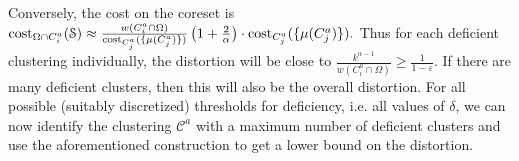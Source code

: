 Conversely, the cost on the coreset is $\text{cost}_{\Omega\cap C_i^a}(\mathcal{S})  
 \approx  \frac{w(C_i^a \cap \Omega)}{ \text{cost}_{C_j^a}(\{\mu(C_j^a)\})}\left(1+\frac{2}{\alpha}\right)\cdot \text{cost}_{C_j^a}(\{\mu(C_j^a)\}).$
Thus for each deficient clustering individually, the distortion will be close to $\frac{k^{\alpha-1}}{w(C_i^a \cap \Omega)} \geq \frac{1}{1-\varepsilon}$.
If there are many deficient clusters, then this will also be the overall distortion.
For all possible (suitably discretized) thresholds for deficiency, i.e. all values of $\delta$, we can now identify the clustering $\mathcal{C}^a$ with a maximum number of deficient clusters and use the aforementioned construction to get a lower bound on the distortion.



